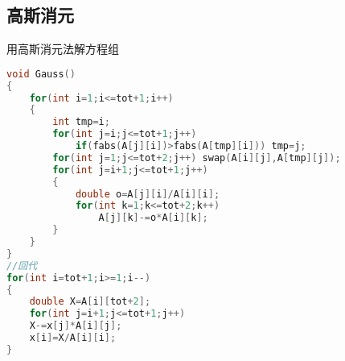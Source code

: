 \subsection{高斯消元}
用高斯消元法解方程组
\begin{lstlisting}[language=C]
void Gauss()
{
    for(int i=1;i<=tot+1;i++)
    {   
        int tmp=i;
        for(int j=i;j<=tot+1;j++)
            if(fabs(A[j][i])>fabs(A[tmp][i])) tmp=j;
        for(int j=1;j<=tot+2;j++) swap(A[i][j],A[tmp][j]);
        for(int j=i+1;j<=tot+1;j++)
        {   
            double o=A[j][i]/A[i][i];
            for(int k=1;k<=tot+2;k++)
                A[j][k]-=o*A[i][k];
        }    
    }   
}
//回代
for(int i=tot+1;i>=1;i--)
{
    double X=A[i][tot+2];
    for(int j=i+1;j<=tot+1;j++)
    X-=x[j]*A[i][j];
    x[i]=X/A[i][i];
}
\end{lstlisting}
